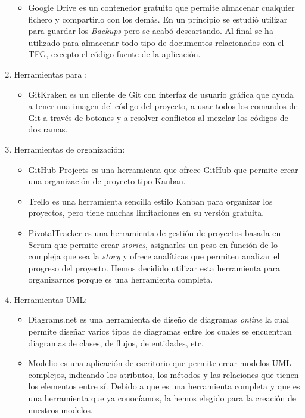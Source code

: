 \documentclass[11pt]{book}
\begin{document}
\begin{enumerate}
\begin{itemize}
			\item Google Drive es un contenedor gratuito que permite almacenar cualquier fichero y compartirlo con los demás. En un principio se estudió utilizar para guardar los \textit{Backups} pero se acabó descartando. Al final se ha utilizado para almacenar todo tipo de documentos relacionados con el TFG, excepto el código fuente de la aplicación.
		\end{itemize}
		\item Herramientas para : 
		\begin{itemize} 
			\item GitKraken es un cliente de Git con interfaz de usuario gráfica que ayuda a tener una imagen del código del proyecto, a usar todos los comandos de Git a través de botones y a resolver conflictos al mezclar los códigos de dos ramas. 
		\end{itemize}
		\item Herramientas de organización: 
		\begin{itemize} 
			\item GitHub Projects es una herramienta que ofrece GitHub que permite crear una organización de proyecto tipo Kanban.
			\item Trello es una herramienta sencilla estilo Kanban para organizar los proyectos, pero tiene muchas limitaciones en su versión gratuita.
			\item PivotalTracker es una herramienta de gestión de proyectos basada en Scrum que permite crear \textit{stories}, asignarles un peso en función de lo compleja que sea la \textit{story} y ofrece analíticas que permiten analizar el progreso del proyecto. Hemos decidido utilizar esta herramienta para organizarnos porque es una herramienta completa.
		\end{itemize}
		\item Herramientas UML: 
		\begin{itemize} 
			\item Diagrams.net es una herramienta de diseño de diagramas \textit{online} la cual permite diseñar varios tipos de diagramas entre los cuales se encuentran diagramas de clases, de flujos, de entidades, etc.
			\item Modelio es una aplicación de escritorio que permite crear modelos UML complejos, indicando los atributos, los métodos y las relaciones que tienen los elementos entre sí. Debido a que es una herramienta completa y que es una herramienta que ya conocíamos, la hemos elegido para la creación de nuestros modelos.
		\end{itemize}

\end{enumerate}
\end{document}
